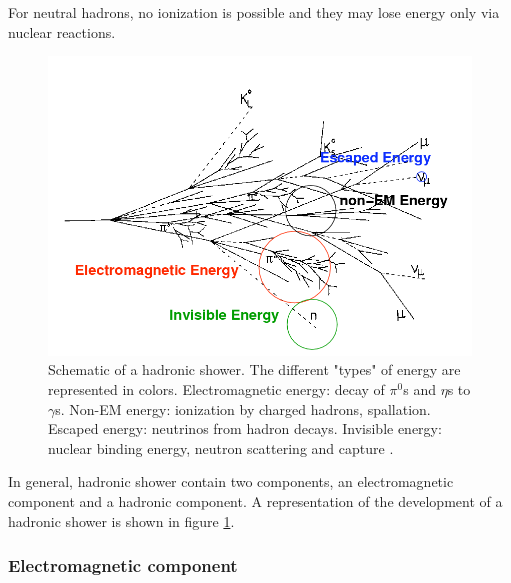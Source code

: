 For neutral hadrons, no ionization is possible and they may lose energy only via nuclear reactions.
\begin{figure}[htbp!]
  \centering
  \includegraphics[width=0.7\linewidth]{chap2/fig/images_had-shower.png}
  \caption{Schematic of a hadronic shower. The different "types" of energy are represented in colors. Electromagnetic energy: decay of $\pi^0$s and $\eta$s to $\gamma$s. Non-EM energy: ionization by charged hadrons, spallation. Escaped energy: neutrinos from hadron decays. Invisible energy: nuclear binding energy, neutron scattering and capture \cite{Grahn:2009ki}.} \label{fig:HadShower}
\end{figure}
In general, hadronic shower contain two components, an electromagnetic component and a hadronic component. A representation of the development of a hadronic shower is shown in figure \ref{fig:HadShower}.

\subsubsection{Electromagnetic component}

